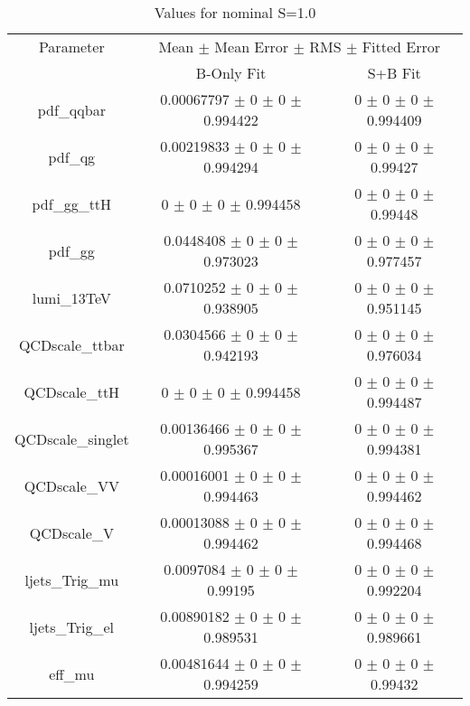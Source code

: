 \begin{table}
\centering
\caption{Values for nominal S=1.0}
\begin{tabular}{ccc}
\toprule
Parameter 	& \multicolumn{2}{c}{Mean $\pm$ Mean Error $\pm$ RMS $\pm$ Fitted Error}\\
 	& B-Only Fit & S+B Fit\\
\midrule
pdf\_qqbar 	& \num{0.00067797} $\pm$ \num{0} $\pm$ \num{0} $\pm$ \num{0.994422} 	& \num{0} $\pm$ \num{0} $\pm$ \num{0} $\pm$ \num{0.994409}\\
pdf\_qg 	& \num{0.00219833} $\pm$ \num{0} $\pm$ \num{0} $\pm$ \num{0.994294} 	& \num{0} $\pm$ \num{0} $\pm$ \num{0} $\pm$ \num{0.99427}\\
pdf\_gg\_ttH 	& \num{0} $\pm$ \num{0} $\pm$ \num{0} $\pm$ \num{0.994458} 	& \num{0} $\pm$ \num{0} $\pm$ \num{0} $\pm$ \num{0.99448}\\
pdf\_gg 	& \num{0.0448408} $\pm$ \num{0} $\pm$ \num{0} $\pm$ \num{0.973023} 	& \num{0} $\pm$ \num{0} $\pm$ \num{0} $\pm$ \num{0.977457}\\
lumi\_13TeV 	& \num{0.0710252} $\pm$ \num{0} $\pm$ \num{0} $\pm$ \num{0.938905} 	& \num{0} $\pm$ \num{0} $\pm$ \num{0} $\pm$ \num{0.951145}\\
QCDscale\_ttbar 	& \num{0.0304566} $\pm$ \num{0} $\pm$ \num{0} $\pm$ \num{0.942193} 	& \num{0} $\pm$ \num{0} $\pm$ \num{0} $\pm$ \num{0.976034}\\
QCDscale\_ttH 	& \num{0} $\pm$ \num{0} $\pm$ \num{0} $\pm$ \num{0.994458} 	& \num{0} $\pm$ \num{0} $\pm$ \num{0} $\pm$ \num{0.994487}\\
QCDscale\_singlet 	& \num{0.00136466} $\pm$ \num{0} $\pm$ \num{0} $\pm$ \num{0.995367} 	& \num{0} $\pm$ \num{0} $\pm$ \num{0} $\pm$ \num{0.994381}\\
QCDscale\_VV 	& \num{0.00016001} $\pm$ \num{0} $\pm$ \num{0} $\pm$ \num{0.994463} 	& \num{0} $\pm$ \num{0} $\pm$ \num{0} $\pm$ \num{0.994462}\\
QCDscale\_V 	& \num{0.00013088} $\pm$ \num{0} $\pm$ \num{0} $\pm$ \num{0.994462} 	& \num{0} $\pm$ \num{0} $\pm$ \num{0} $\pm$ \num{0.994468}\\
ljets\_Trig\_mu 	& \num{0.0097084} $\pm$ \num{0} $\pm$ \num{0} $\pm$ \num{0.99195} 	& \num{0} $\pm$ \num{0} $\pm$ \num{0} $\pm$ \num{0.992204}\\
ljets\_Trig\_el 	& \num{0.00890182} $\pm$ \num{0} $\pm$ \num{0} $\pm$ \num{0.989531} 	& \num{0} $\pm$ \num{0} $\pm$ \num{0} $\pm$ \num{0.989661}\\
eff\_mu 	& \num{0.00481644} $\pm$ \num{0} $\pm$ \num{0} $\pm$ \num{0.994259} 	& \num{0} $\pm$ \num{0} $\pm$ \num{0} $\pm$ \num{0.99432}\\

\end{tabular}
\end{table}
